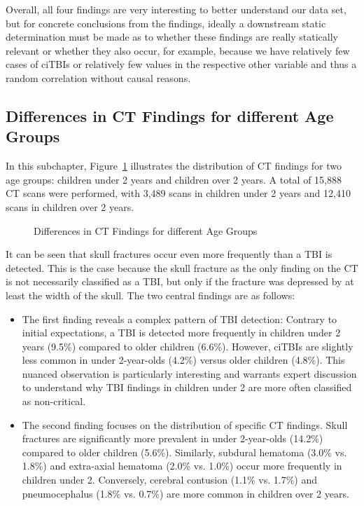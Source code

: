 \documentclass[10pt,letterpaper]{article}
\begin{document}
Overall, all four findings are very interesting to better understand our data set, but for concrete conclusions from the findings, ideally a downstream static determination must be made as to whether these findings are really statically relevant or whether they also occur, for example, because we have relatively few cases of ciTBIs or relatively few values in the respective other variable and thus a random correlation without causal reasons.

\subsection{Differences in CT Findings for different Age Groups}\label{third-finding}

In this subchapter, Figure~\ref{fig:third_finding} illustrates the distribution of CT findings for two age groups: children under 2 years and children over 2 years. A total of 15,888 CT scans were performed, with 3,489 scans in children under 2 years and 12,410 scans in children over 2 years.

\begin{figure}[H]
    \centering
    \caption{Differences in CT Findings for different Age Groups}
    \label{fig:third_finding}
\end{figure}

It can be seen that skull fractures occur even more frequently than a TBI is detected. This is the case because the skull fracture as the only finding on the CT is not necessarily classified as a TBI, but only if the fracture was depressed by at least the width of the skull. The two central findings are as follows:

\begin{itemize}
\item The first finding reveals a complex pattern of TBI detection: Contrary to initial expectations, a TBI is detected more frequently in children under 2 years (9.5\%) compared to older children (6.6\%). However, ciTBIs are slightly less common in under 2-year-olds (4.2\%) versus older children (4.8\%). This nuanced observation is particularly interesting and warrants expert discussion to understand why TBI findings in children under 2 are more often classified as non-critical.
\item The second finding focuses on the distribution of specific CT findings. Skull fractures are significantly more prevalent in under 2-year-olds (14.2\%) compared to older children (5.6\%). Similarly, subdural hematoma (3.0\% vs. 1.8\%) and extra-axial hematoma (2.0\% vs. 1.0\%) occur more frequently in children under 2. Conversely, cerebral contusion (1.1\% vs. 1.7\%) and pneumocephalus (1.8\% vs. 0.7\%) are more common in children over 2 years.
\end{itemize}
\end{document}
